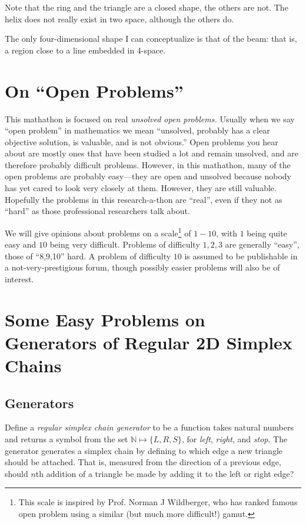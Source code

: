 \documentclass[11pt]{article}
\begin{document}
Note that the ring and the triangle are a closed shape, the others are not.
The helix does not really exist in two space, although the others do.

The only four-dimensional shape I can conceptualize is that of the
beam: that is, a region close to a line embedded in 4-space.

\section{On ``Open Problems''}

This mathathon is focused on real {\em unsolved open problems.}
Usually when we say ``open problem'' in mathematics we mean ``unsolved, probably has a clear objective solution, is valuable,
and is not obvious.''
Open problems you hear about are mostly ones that have been studied a lot and remain unsolved, and are therefore probably difficult problems.
However, in this mathathon, many of the open problems are probably easy---they are open and unsolved because nobody has yet
cared to look very closely at them.  However, they are still valuable. Hopefully the problems in this research-a-thon are ``real'', even if they
not as ``hard'' as those professional researchers talk about.

We will give opinions about problems on a scale\footnote{This scale is inspired by Prof. Norman J Wildberger, who has ranked famous open problem using a similar
  (but much more difficult!) gamut.} of $1-10$, with $1$ being quite easy and $10$ being very difficult. Problems of difficulty $1,2,3$
are generally ``easy'', those of ``8,9,10'' hard.  A problem of difficulty $10$ is assumed to be publishable in a not-very-prestigious forum, though
possibly easier problems will also be of interest. 

\section{Some Easy Problems on Generators of Regular 2D Simplex Chains}

\subsection{Generators}

Define a {\em regular simplex chain generator} to be a function takes natural numbers and returns a symbol from the set $\mathbb{N} \mapsto \{L,R,S\}$,
  for {\em left}, {\em right}, and {\em stop}. The generator generates a simplex chain by defining to which edge a new triangle should
  be attached. That is, measured from the direction of a previous edge, should $n$th addition of a triangle be made by adding it
  to the left or right edge?
\end{document}
